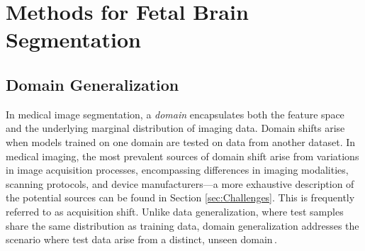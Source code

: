 \chapter{Methods for Fetal Brain Segmentation} \label{chap:MethodsForFetalBrainSegmentation}
\vspace{1cm}



\section{Domain Generalization}
In medical image segmentation, a \emph{domain} encapsulates both the feature space and the underlying marginal distribution of imaging data. Domain shifts arise when models trained on one domain are tested on data from another dataset. In medical imaging, the most prevalent sources of domain shift arise from variations in image acquisition processes, encompassing differences in imaging modalities, scanning protocols, and device manufacturers---a more exhaustive description of the potential sources can be found in Section \ref{sec:Challenges}. This is frequently referred to as acquisition shift. Unlike data generalization, where test samples share the same distribution as training data, domain generalization addresses the scenario where test data arise from a distinct, unseen domain\,\cite{Ouyang2023}.

